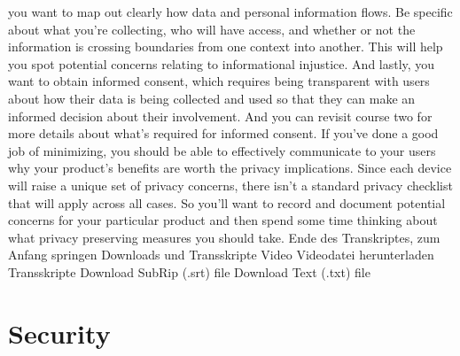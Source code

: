 you want to map out clearly how data and personal information flows.
Be specific about what you're collecting, who will have access,
and whether or not the information is crossing boundaries from one context
into another.
This will help you spot potential concerns relating
to informational injustice.
And lastly, you want to obtain informed consent, which
requires being transparent with users about how their data is being collected
and used so that they can make an informed
decision about their involvement.
And you can revisit course two for more details about what's
required for informed consent.
If you've done a good job of minimizing, you
should be able to effectively communicate to your users
why your product's benefits are worth the privacy implications.
Since each device will raise a unique set of privacy concerns,
there isn't a standard privacy checklist that will apply across all cases.
So you'll want to record and document potential concerns
for your particular product and then spend
some time thinking about what privacy preserving measures you should take.
Ende des Transkriptes, zum Anfang springen
Downloads und Transskripte
Video
Videodatei herunterladen
Transskripte
Download SubRip (.srt) file
Download Text (.txt) file

    
\section{Security}

